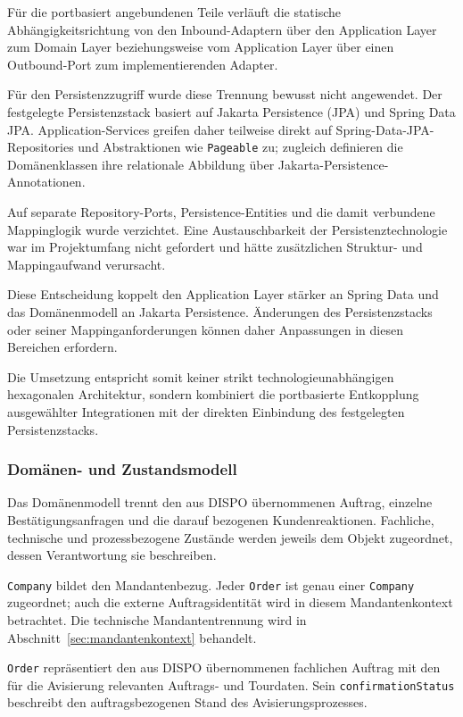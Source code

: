 Für die portbasiert angebundenen Teile verläuft die statische
Abhängigkeitsrichtung von den Inbound-Adaptern über den Application Layer zum
Domain Layer beziehungsweise vom Application Layer über einen Outbound-Port
zum implementierenden Adapter.

Für den Persistenzzugriff wurde diese Trennung bewusst nicht angewendet. Der
festgelegte Persistenzstack basiert auf Jakarta Persistence (JPA) und Spring
Data JPA. Application-Services greifen daher teilweise direkt auf
Spring-Data-JPA-Repositories und Abstraktionen wie \texttt{Pageable} zu;
zugleich definieren die Domänenklassen ihre relationale Abbildung über
Jakarta-Persistence-Annotationen.

Auf separate Repository-Ports, Persistence-Entities und die damit verbundene
Mappinglogik wurde verzichtet. Eine Austauschbarkeit der Persistenztechnologie
war im Projektumfang nicht gefordert und hätte zusätzlichen Struktur- und
Mappingaufwand verursacht.

Diese Entscheidung koppelt den Application Layer stärker an Spring Data und
das Domänenmodell an Jakarta Persistence. Änderungen des Persistenzstacks oder
seiner Mappinganforderungen können daher Anpassungen in diesen Bereichen
erfordern.

Die Umsetzung entspricht somit keiner strikt technologieunabhängigen
hexagonalen Architektur, sondern kombiniert die portbasierte Entkopplung
ausgewählter Integrationen mit der direkten Einbindung des festgelegten
Persistenzstacks.

\subsubsection{Domänen- und Zustandsmodell}
\label{sec:domaenenmodell}

Das Domänenmodell trennt den aus DISPO übernommenen Auftrag, einzelne
Bestätigungsanfragen und die darauf bezogenen Kundenreaktionen. Fachliche,
technische und prozessbezogene Zustände werden jeweils dem Objekt zugeordnet,
dessen Verantwortung sie beschreiben.

\texttt{Company} bildet den Mandantenbezug. Jeder \texttt{Order} ist genau
einer \texttt{Company} zugeordnet; auch die externe Auftragsidentität wird in
diesem Mandantenkontext betrachtet. Die technische Mandantentrennung wird in
Abschnitt~\ref{sec:mandantenkontext} behandelt.

\texttt{Order} repräsentiert den aus DISPO übernommenen fachlichen Auftrag mit
den für die Avisierung relevanten Auftrags- und Tourdaten. Sein
\texttt{confirmationStatus} beschreibt den auftragsbezogenen Stand des
Avisierungsprozesses.

